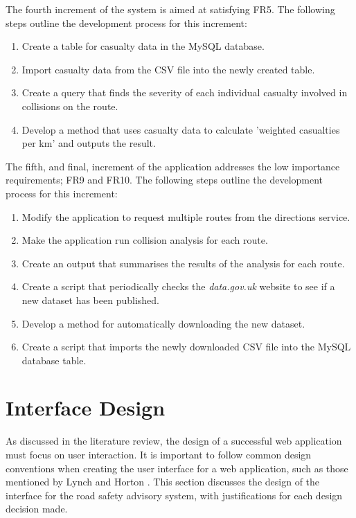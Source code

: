 \documentclass[authoryearcitations]{UoYCSproject}
\begin{document}
The fourth increment of the system is aimed at satisfying FR5. The following steps outline the development process for this increment:
\begin{enumerate}
	\item Create a table for casualty data in the MySQL database.
	\item Import casualty data from the CSV file into the newly created table. 
	\item Create a query that finds the severity of each individual casualty involved in collisions on the route.
	\item Develop a method that uses casualty data to calculate 'weighted casualties per km' and outputs the result.	
\end{enumerate}

The fifth, and final, increment of the application addresses the low importance requirements; FR9 and FR10. The following steps outline the development process for this increment:
\begin{enumerate}
	\item Modify the application to request multiple routes from the directions service.
	\item Make the application run collision analysis for each route.
	\item Create an output that summarises the results of the analysis for each route.
	\item Create a script that periodically checks the \textit{data.gov.uk} website to see if a new dataset has been published.
	\item Develop a method for automatically downloading the new dataset.
	\item Create a script that imports the newly downloaded CSV file into the MySQL database table.
\end{enumerate}


\section{Interface Design}

As discussed in the literature review, the design of a successful web application must focus on user interaction. It is important to follow common design conventions when creating the user interface for a web application, such as those mentioned by Lynch and Horton \citep{Lynch2009}. This section discusses the design of the interface for the road safety advisory system, with justifications for each design decision made.
\end{document}
